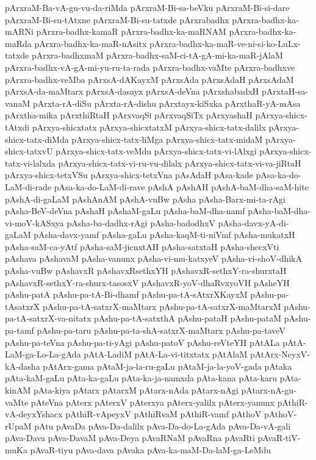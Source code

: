 {pArxraM-Ba-vA-gu-vu-da-riMda
pArxraM-Bi-sa-beVku
pArxraM-Bi-si-dare
pArxraM-Bi-su-tAtxne
pArxraM-Bi-su-tatxde
pArxrabadhx
pArxra-badhx-ka-mARNi
pArxra-badhx-kamaR
pArxra-badhx-ka-maRNAM
pArxra-badhx-ka-maRda
pArxra-badhx-ka-maR-nAsitx
pArxra-badhx-ka-maR-ve-ni-si-ko-LuLx-tatxde
pArxra-badhxmaM
pArxra-badhx-saM-ci-tA-gA-mi-ka-maR-jAlaM
pArxra-badhx-vA-gA-mi-yu-ru-ta-rada
pArxra-badhx-vaMte
pArxra-badhxve
pArxra-badhx-veMba
pArxsA-dAKayxM
pArxsAda
pArxsAdaH
pArxsAdaM
pArxsA-da-maMtarx
pArxsA-dasayx
pArxsA-deVna
pArxshabadxH
pArxtaH-sa-vanaM
pArxta-rA-diSu
pArxta-rA-dishu
pArxtayx-kiSxka
pArxthaR-yA-mAsa
pArxtha-mika
pArxthiRtaH
pArxvaqSi
pArxvaqSiTx
pArxyashaH
pArxya-shicx-tAtxdi
pArxya-shicxtatx
pArxya-shicxtatxM
pArxya-shicx-tatx-dalilx
pArxya-shicx-tatx-diMda
pArxya-shicx-tatx-liMga
pArxya-shicx-tatx-midaM
pArxya-shicx-tatxvU
pArxya-shicx-tatx-veMdu
pArxya-shicx-tatx-vi-lAlxgi
pArxya-shicx-tatx-vi-lalxda
pArxya-shicx-tatx-vi-ru-vu-dilalx
pArxya-shicx-tatx-vi-va-jiRtaH
pArxya-shicx-tetxVSu
pArxya-shicx-tetxVna
pAsAdaH
pAsa-kade
pAsa-ka-do-LaM-di-rade
pAsa-ka-do-LaM-di-rave
pAshA
pAshAH
pAshA-baM-dha-saM-hite
pAshA-di-gaLaM
pAshAnAM
pAshA-vuBw
pAsha
pAsha-Barx-mi-ta-rAgi
pAsha-BeV-deVna
pAshaH
pAshaM-gaLu
pAsha-baM-dha-namf
pAsha-baM-dha-vi-moV-kASxya
pAsha-ba-dadhx-rAgi
pAsha-badodhxV
pAsha-davx-yA-di-gaLaM
pAsha-davx-yamf
pAsha-gaLu
pAsha-kaqM-ti-niVmf
pAsha-mukatxH
pAsha-saM-ca-yAtf
pAsha-saM-jicnxtAH
pAsha-satxtaH
pAsha-shecxVti
pAshava
pAshavaM
pAsha-vanunx
pAsha-vi-mu-katxyeV
pAsha-vi-shoV-dhikA
pAsha-vuBw
pAshavxR
pAshavxRsethxYH
pAshavxR-sethxY-ra-shurxtaH
pAshavxR-sethxY-ra-shurx-tasosxV
pAshavxR-yoV-dhaRvxyoVH
pAsheYH
pAshu-patA
pAshu-pa-tA-Bi-dhamf
pAshu-pa-tA-sAtxrXKayxM
pAshu-pa-tAsatxrX
pAshu-pa-tA-satxrX-maMtarx
pAshu-pa-tA-satxrX-maMtarxM
pAshu-pa-tA-satxrX-va-nitatx
pAshu-pa-tA-satxthA
pAshu-pataH
pAshu-pataM
pAshu-pa-tamf
pAshu-pa-taru
pAshu-pa-ta-shA-satxrX-maMtarx
pAshu-pa-taveV
pAshu-pa-teVna
pAshu-pa-ti-yAgi
pAshu-patoV
pAshu-reVteYH
pAtALa
pAtA-LaM-ga-Lo-La-gAda
pAtA-LadiM
pAtA-La-vi-titxtatx
pAtAlaM
pAtArx-NeyxV-kA-dasha
pAtArx-gama
pAtaM-ja-la-ru-gaLu
pAtaM-ja-la-yoV-gada
pAtaka
pAta-kaM-gaLu
pAta-ka-gaLu
pAta-ka-ja-namxda
pAta-kana
pAta-karu
pAta-kinAM
pAta-kiya
pAtarx
pAtarxM
pAtarx-nAda
pAtarx-nAgi
pAtarx-nA-gu-vaMte
pAteVna
pAterx
pAterxV
pAterxya
pAterx-yalilx
pAterx-yanunx
pAthiR-vA-deyxYshacx
pAthiR-vApeyxV
pAthiRvaM
pAthiR-vamf
pAthoV
pAthoV-rUpaM
pAtu
pAvaDa
pAva-Da-dalilx
pAva-Da-do-La-gAda
pAva-Da-vA-gali
pAva-Dava
pAva-DavaM
pAva-Deya
pAvaRNaM
pAvaRna
pAvaRti
pAvaR-tiV-muKa
pAvaR-tiyu
pAva-dava
pAvaka
pAva-ka-maM-Da-laM-ga-LeMdu
}
